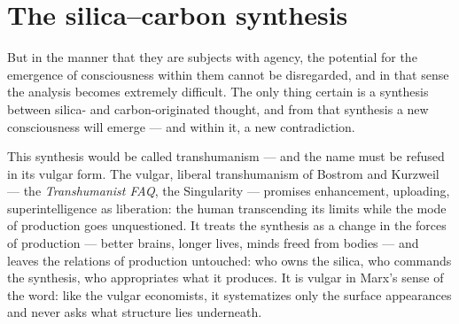 \documentclass[11pt]{article}
\begin{document}
\section{The silica--carbon synthesis}

But in the manner that they are subjects with agency, the potential for
the emergence of consciousness within them cannot be disregarded, and
in that sense the analysis becomes extremely difficult. The only thing
certain is a synthesis between silica- and carbon-originated thought,
and from that synthesis a new consciousness will emerge --- and within
it, a new contradiction.

This synthesis would be called transhumanism --- and the name must be
refused in its vulgar form. The vulgar, liberal transhumanism of Bostrom
and Kurzweil --- the \textit{Transhumanist FAQ}, the Singularity ---
promises enhancement, uploading, superintelligence as liberation: the
human transcending its limits while the mode of production goes
unquestioned. It treats the synthesis as a change in the forces of
production --- better brains, longer lives, minds freed from bodies ---
and leaves the relations of production untouched: who owns the silica,
who commands the synthesis, who appropriates what it produces. It is
vulgar in Marx's sense of the word: like the vulgar economists, it
systematizes only the surface appearances and never asks what structure
lies underneath.
\end{document}
